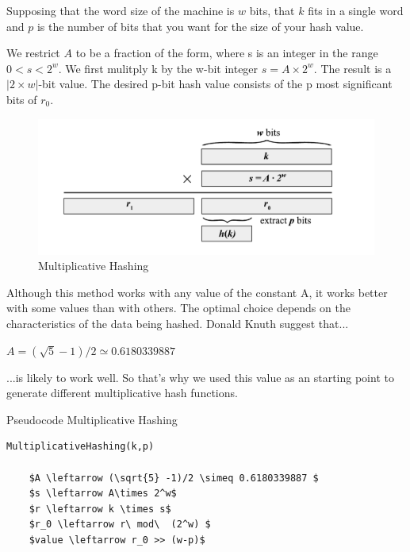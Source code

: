 \documentclass[12pt]{article}
\begin{document}
{\vspace{0.4cm}
Supposing that the word size of the machine is $w$ bits, that $k$ fits in a single word and $p$ is the number of bits that you want for the size of your hash value.

 We restrict $A$ to be a fraction of the form, where s is an integer in the range $0<s<2^w$. We first mulitply k by the w-bit integer $s = A\times 2^w$. The result is a $|2 \times w| $-bit value. The desired p-bit hash value consists of the p most significant bits of $r_0$. 


\begin{figure}[H]
	\centering
	\includegraphics[scale=0.7]{graphs/MultiplicativeHashingDiagram.pdf}
	\caption{Multiplicative Hashing}
	\label{fig:MultiplicativeHashing}
\end{figure}

\bigskip

Although this method works with any value of the constant A, it works better with some values than with others. The optimal choice depends on the characteristics of the data being hashed. Donald Knuth suggest that...

$ A = (\sqrt{5} -1)/2 \simeq 0.6180339887  $

...is likely to work well. So that's why we used this value as an starting point to generate different multiplicative hash functions.
\bigskip

\begin{center}
\begin{large}
Pseudocode Multiplicative Hashing
\end{large}
\end{center}

\begin{lstlisting}[mathescape=true]
MultiplicativeHashing(k,p)

	$A \leftarrow (\sqrt{5} -1)/2 \simeq 0.6180339887 $
	$s \leftarrow A\times 2^w$
	$r \leftarrow k \times s$ 
	$r_0 \leftarrow r\ mod\  (2^w) $ 
	$value \leftarrow r_0 >> (w-p)$


\end{lstlisting}}
\end{document}
